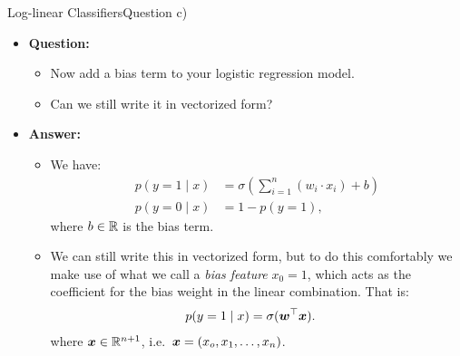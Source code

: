 \documentclass[t]{beamer}
\begin{document}
\begin{frame}{Log-linear Classifiers}{Question c)}
    \begin{itemize}
        \item \textbf{Question:}
              \begin{itemize}
                  \item Now add a bias term to your logistic regression model.
                  \item Can we still write it in vectorized form?
              \end{itemize}
              \pause
        \item \textbf{Answer:}
              \begin{itemize}
                  \item We have:
                        \begin{align}
                            p(y=1\mid x) & = \sigma\left(\sum_{i=1}^{n}(w_i\cdot x_i) + b\right) \\
                            p(y=0\mid x) & = 1-p(y=1),
                        \end{align}
                        where $b\in\mathbb{R}$ is the bias term.
                  \item We can still write this in vectorized form, but to do
                        this comfortably we make use of what we call a
                        \emph{bias feature} $x_0=1$, which acts as the
                        coefficient for the bias weight in the linear
                        combination. That is:
                        \begin{align}
                            p(y=1\mid x) & = \sigma({\boldsymbol{w}}^\top{\boldsymbol{x}}).
                        \end{align}
                        where ${\boldsymbol{x}}\in\mathbb{R}^{n+1}$, i.e.\
                        ${\boldsymbol{x}}=(x_o, x_1, \ldots, x_n)$.
              \end{itemize}
    \end{itemize}
\end{frame}
\end{document}
